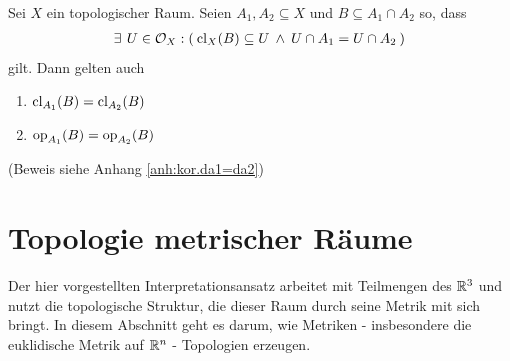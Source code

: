     \begin{kor}\label{kor:da1=da2} \ \vspace{8pt}

        \noindent
        Sei $X$ ein topologischer Raum. Seien $A_1, A_2 \subseteq X$ und $B \subseteq A_1 \cap A_2$ so, dass
        \begin{align*}
            \exists\: \, U \in \mathcal{O}_X: (\: \text{cl}_X(B) \subseteq U \:\land\: U \cap A_1 = U \cap A_2 \:)
        \end{align*}
        gilt. Dann gelten auch  
        \begin{enumerate}
            \item \label{kor:da1=da2.1} $\text{cl}_{A_1}(B) = \text{cl}_{A_2}(B)$
            \item \label{kor:da1=da2.2} $\text{op}_{A_1}(B) = \text{op}_{A_2}(B)$
        \end{enumerate} 
        (Beweis siehe Anhang \ref{anh:kor.da1=da2})
    \end{kor}
    
    
    
    
    
    


\section{Topologie metrischer Räume}\label{sec:top-metr-raeume}

    Der hier vorgestellten Interpretationsansatz arbeitet mit Teilmengen des $\mathbb{R}^3$ und nutzt die topologische Struktur, die dieser Raum durch seine Metrik mit sich bringt.
    In diesem Abschnitt geht es darum, wie Metriken - insbesondere die euklidische Metrik auf $\mathbb{R}^n$ - Topologien erzeugen.
    
